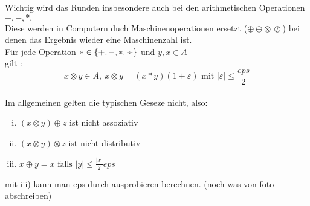 Wichtig wird das Runden insbesondere auch bei den arithmetischen Operationen $+,-,*,$ \textdiv
\\Diese werden in Computern duch Maschinenoperationen ersetzt 
($\oplus \ominus \otimes\, \oslash$) bei denen das Ergebnis wieder eine Maschinenzahl ist.\\
Für jede Operation $\ast\in \{+,-,*,\text{\textdiv}\}$ und $y,x \in A$ \\gilt :$$x \otimes y\in A,\ x \otimes y =(x*y)(1+\varepsilon) \text{ mit } |\varepsilon|\leq \frac{eps}{2}$$\\
Im allgemeinen gelten die typischen Geseze nicht, also:\\
\begin{enumerate}[i)]
    \item $(x \otimes y) \oplus z$ ist nicht assoziativ
    \item $(x \otimes y) \otimes z$ ist nicht distributiv
    \item $x \oplus y =x \text{ falls } |y|\leq \displaystyle\frac{|x|}{2}eps$
\end{enumerate}
mit iii) kann man eps durch ausprobieren berechnen.
(noch was von foto abschreiben)
